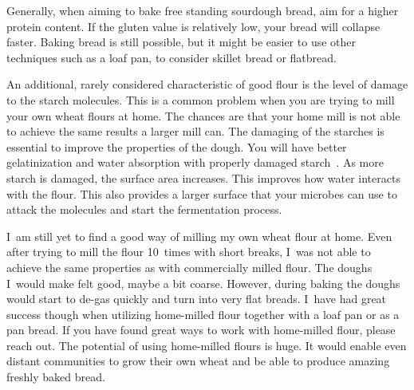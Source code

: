 Generally, when aiming to
bake free standing sourdough bread, aim for a higher protein content. If the
gluten value is relatively low, your bread will collapse faster. Baking bread
is still possible, but it might be easier to use other techniques such as a
loaf pan, to consider skillet bread or flatbread.

An additional, rarely considered characteristic of good flour is the level of damage to the
starch molecules. This is a common problem when you are trying to mill your own wheat flours at
home. The chances are that your home mill is not able to achieve the same results
a larger mill can. The damaging of the starches is essential to improve the
properties of the dough. You will have better gelatinization and water
absorption with properly damaged starch~\cite{starch+damage+flour}. As more
starch is damaged, the surface area increases. This improves how water interacts with the flour.
This also provides a larger surface that your microbes can use to attack the molecules
and start the fermentation process.

I~am still
yet to find a good way of milling my own wheat flour at home. Even after trying to
mill the flour 10~times with short breaks, I~was not able to achieve the same
properties as with commercially milled flour. The doughs I~would make felt
good, maybe a bit coarse. However, during baking the doughs would start to
de-gas quickly and turn into very flat breads. I~have had great success though when
utilizing home-milled flour together with a loaf pan or as a pan bread. If you
have found great ways to work with home-milled flour, please reach out. The potential
of using home-milled flours is huge. It would enable even distant communities
to grow their own wheat and be able to produce amazing freshly baked bread.
